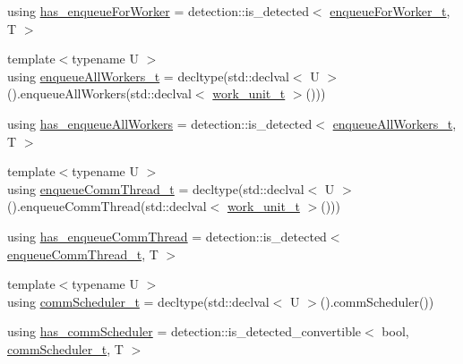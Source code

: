\begin{DoxyCompactItemize}
\item 
using \hyperlink{structvt_1_1worker_1_1_worker_group_traits_a44c2ef67f7c30419b35c8e550aa73d91}{has\+\_\+enqueue\+For\+Worker} = detection\+::is\+\_\+detected$<$ \hyperlink{structvt_1_1worker_1_1_worker_group_traits_abc65803c8886a88507e51c0798fe38a7}{enqueue\+For\+Worker\+\_\+t}, T $>$
\item 
{\footnotesize template$<$typename U $>$ }\\using \hyperlink{structvt_1_1worker_1_1_worker_group_traits_a408b704c65e78ddd4f90963eb4e48cf0}{enqueue\+All\+Workers\+\_\+t} = decltype(std\+::declval$<$ U $>$().enqueue\+All\+Workers(std\+::declval$<$ \hyperlink{structvt_1_1worker_1_1_worker_group_traits_ae7c108d04180f59f3e2cd4fa065be4b0}{work\+\_\+unit\+\_\+t} $>$()))
\item 
using \hyperlink{structvt_1_1worker_1_1_worker_group_traits_ae2e54acc294e8701af36511ffef93af3}{has\+\_\+enqueue\+All\+Workers} = detection\+::is\+\_\+detected$<$ \hyperlink{structvt_1_1worker_1_1_worker_group_traits_a408b704c65e78ddd4f90963eb4e48cf0}{enqueue\+All\+Workers\+\_\+t}, T $>$
\item 
{\footnotesize template$<$typename U $>$ }\\using \hyperlink{structvt_1_1worker_1_1_worker_group_traits_a576f8d9a2343be8a876df90d1eb9c955}{enqueue\+Comm\+Thread\+\_\+t} = decltype(std\+::declval$<$ U $>$().enqueue\+Comm\+Thread(std\+::declval$<$ \hyperlink{structvt_1_1worker_1_1_worker_group_traits_ae7c108d04180f59f3e2cd4fa065be4b0}{work\+\_\+unit\+\_\+t} $>$()))
\item 
using \hyperlink{structvt_1_1worker_1_1_worker_group_traits_ad12299517527c3a0b977d06da86a637e}{has\+\_\+enqueue\+Comm\+Thread} = detection\+::is\+\_\+detected$<$ \hyperlink{structvt_1_1worker_1_1_worker_group_traits_a576f8d9a2343be8a876df90d1eb9c955}{enqueue\+Comm\+Thread\+\_\+t}, T $>$
\item 
{\footnotesize template$<$typename U $>$ }\\using \hyperlink{structvt_1_1worker_1_1_worker_group_traits_a97c79042b7a6588067d2fdf836fc38ab}{comm\+Scheduler\+\_\+t} = decltype(std\+::declval$<$ U $>$().comm\+Scheduler())
\item 
using \hyperlink{structvt_1_1worker_1_1_worker_group_traits_a865df688c9b5f7fc67ebfcee3bca1273}{has\+\_\+comm\+Scheduler} = detection\+::is\+\_\+detected\+\_\+convertible$<$ bool, \hyperlink{structvt_1_1worker_1_1_worker_group_traits_a97c79042b7a6588067d2fdf836fc38ab}{comm\+Scheduler\+\_\+t}, T $>$
\end{DoxyCompactItemize}
